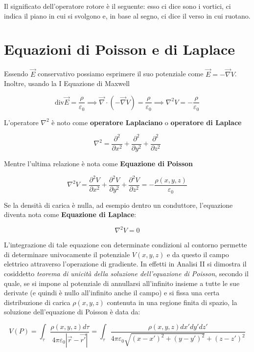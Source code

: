 Il significato dell'operatore rotore è il seguente: esso ci dice sono i vortici, ci indica il piano in cui si svolgono e, in base al segno, ci dice il verso in cui ruotano.

\section{Equazioni di Poisson e di Laplace}

Essendo $\vec{E}$ conservativo possiamo esprimere il suo potenziale come $\vec{E} = -\vec{\nabla} V$. Inoltre, usando la I Equazione di Maxwell

\[
	\text{div}\vec{E} = \frac{\rho}{\varepsilon_0}\implies \vec{\nabla} \cdot (-\vec{\nabla} V)=\frac{\rho}{\varepsilon_0} \implies \nabla^2 V=-\frac{\rho}{\varepsilon_0}
\]

L'operatore $ \nabla^2 $ è noto come \textbf{operatore Laplaciano} o \textbf{operatore di Laplace}

\[
	\nabla^2 = \frac{\partial^2}{\partial x^2} + \frac{\partial^2}{\partial y^2} + \frac{\partial^2}{\partial z^2}
\]

Mentre l'ultima relazione è nota come \textbf{Equazione di Poisson}

\[
	\boxed{\nabla^2V = \frac{\partial^2 V}{\partial x^2} + \frac{\partial^2 V}{\partial y^2} + \frac{\partial^2 V}{\partial z^2} = - \frac{\rho(x,y,z)}{\varepsilon_0}}
\]

Se la densità di carica è nulla, ad esempio dentro un conduttore, l'equazione diventa nota come \textbf{Equazione di Laplace}:

\[
	\nabla^2 V=0
\]

L'integrazione di tale equazione con determinate condizioni al
contorno permette di determinare univocamente il potenziale $ V(x,y,z) $ e da questo il campo elettrico attraverso l'operazione di gradiente. In effetti in Analisi II si dimostra il cosiddetto \emph{teorema di unicità della soluzione dell'equazione di Poisson}, secondo il quale, se si impone al potenziale di annullarsi all'infinito insieme a tutte le sue derivate (e quindi è nullo all'infinito anche il campo) e si fissa una certa distribuzione di carica $ \rho (x,y,z)$ contenuta in una regione finita di spazio, la soluzione dell'equazione di Poisson è data da:

\[
	V(P)= \int_{\tau}\frac{\rho (x,y,z) d\tau}{4\pi \varepsilon_0 |\vec{r} -\vec{r'}|} = \int_{\tau} \frac{\rho (x,y,z) dx'dy'dz'}{4\pi \varepsilon_0 \sqrt{(x-x')^2 + (y-y')^2} +(z-z')^2}
\]

